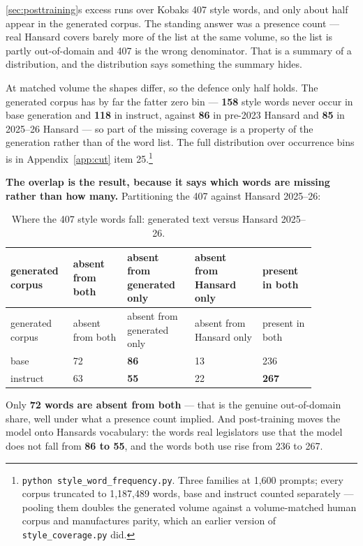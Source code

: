 \cref{sec:posttraining}\textquotesingle s excess runs over Kobak\textquotesingle s 407 style words, and only about half appear in
the generated corpus. The standing answer was a presence count --- real Hansard
covers barely more of the list at the same volume, so the list is partly
out-of-domain and 407 is the wrong denominator. That is a summary of a
distribution, and the distribution says something the summary hides.

At matched volume the shapes differ, so the defence only half holds. The
generated corpus has by far the fatter zero bin --- \textbf{158} style words never
occur in base generation and \textbf{118} in instruct, against \textbf{86} in pre-2023
Hansard and \textbf{85} in 2025--26 Hansard --- so part of the missing coverage is a
property of the generation rather than of the word list. The full distribution
over occurrence bins is in Appendix~\ref{app:cut} item 25.\footnote{\texttt{python\ style\_\allowbreak{}word\_\allowbreak{}frequency.\allowbreak{}py}. Three families at 1,600 prompts;
  every corpus truncated to 1,187,489 words, base and instruct counted
  separately --- pooling them doubles the generated volume against a
  volume-matched human corpus and manufactures parity, which an earlier
  version of \texttt{style\_coverage.py} did.}

\textbf{The overlap is the result, because it says which words are missing rather
than how many.} Partitioning the 407 against Hansard 2025--26:

\begingroup\small
\begin{longtable}[]{@{}p{0.15\linewidth}p{0.16\linewidth}p{0.20\linewidth}p{0.20\linewidth}p{0.16\linewidth}@{}}
\caption{Where the 407 style words fall: generated text versus Hansard 2025--26.}\label{tab:coverage-partition}\\
\toprule\noalign{}
generated corpus & absent from both & absent from generated only & absent from Hansard only & present in both \\
\midrule\noalign{}
\endfirsthead
\toprule\noalign{}
generated corpus & absent from both & absent from generated only & absent from Hansard only & present in both \\
\midrule\noalign{}
\endhead
\bottomrule\noalign{}
\endlastfoot
base & 72 & \textbf{86} & 13 & 236 \\
instruct & 63 & \textbf{55} & 22 & \textbf{267} \\
\end{longtable}
\endgroup

Only \textbf{72 words are absent from both} --- that is the genuine out-of-domain
share, well under what a presence count implied. And post-training moves the
model onto Hansard\textquotesingle s vocabulary: the words real legislators use that the model
does not fall from \textbf{86 to 55}, and the words both use rise from 236 to 267.

